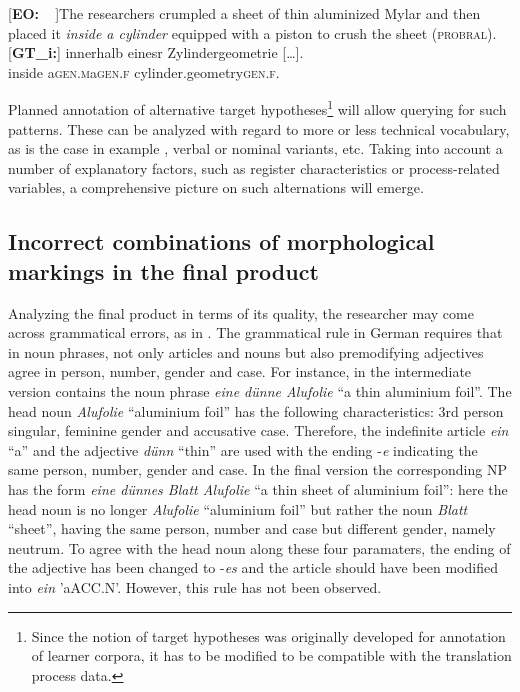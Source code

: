 \documentclass[output=paper]{LSP/langsci}
\begin{document}
\ea \label{ex:1:6}
\begin{xlist}
\exi{}[\textbf{EO:~~}]{The researchers crumpled a sheet of thin aluminized Mylar and then placed it \emph{inside a cylinder} equipped with a piston to crush the sheet (\textsc{probral}).}
\exi{}[\textbf{GT\_i:}]{
\gll [...] innerhalb\raute{} eines\stern\raute\stern\stern\stern\stern\pfeil\pfeil{}r\raute{}  Z\stern{}ylindergeometrie [\dots].\\
{} inside a\textsc{gen.m}\stern\raute\stern\stern\stern\stern{}a\textsc{gen.f} cylinder.geometry\textsc{gen.f}.\\}
\end{xlist}
\z

Planned annotation of alternative target hypotheses\footnote{Since the notion of target hypotheses was originally developed for annotation of learner corpora, it has to be modified to be compatible with the translation process data.}  will allow querying for such patterns. These can be analyzed with regard to more or less technical vocabulary, as is the case in example , verbal or nominal variants, etc. Taking into account a number of explanatory factors, such as register characteristics or process-related variables, a comprehensive picture on such alternations will emerge. 

\subsection{Incorrect combinations of morphological markings in the final product}
Analyzing the final product in terms of its quality, the researcher may come across grammatical errors, as in . The grammatical rule in German requires that in noun phrases, not only articles and nouns but also premodifying adjectives agree in person, number, gender and case. For instance, in  the intermediate version contains the noun phrase \textit{eine dünne Alufolie} “a thin aluminium foil”. The head noun \textit{Alufolie} “aluminium foil” has the following characteristics: 3rd person singular, feminine gender and accusative case. Therefore, the indefinite article \textit{ein} “a” and the adjective \textit{dünn} “thin” are used with the ending -\textit{e} indicating the same person, number, gender and case. In the final version the corresponding NP has the form \textit{eine dünnes Blatt Alufolie} “a thin sheet of aluminium foil”: here the head noun is no longer \textit{Alufolie} “aluminium foil” but rather the noun \textit{Blatt} “sheet”, having the same person, number and case but different gender, namely neutrum. To agree with the head noun along these four paramaters, the ending of the adjective has been changed to -\textit{es} and the article should have been modified into \textit{ein} 'a{\tiny ACC.N}'. However, this rule has not been observed.
\end{document}
